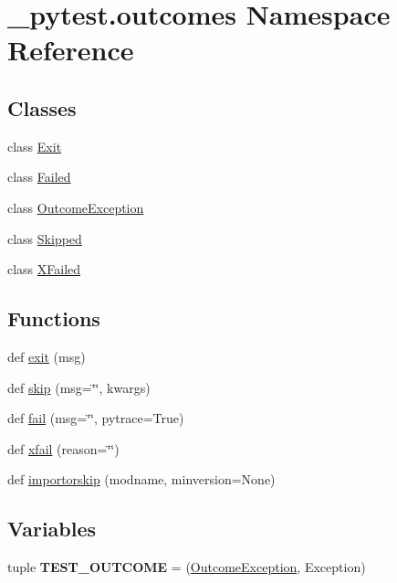 \hypertarget{namespace__pytest_1_1outcomes}{}\section{\+\_\+pytest.\+outcomes Namespace Reference}
\label{namespace__pytest_1_1outcomes}
\subsection*{Classes}
\begin{DoxyCompactItemize}
\item 
class \hyperlink{class__pytest_1_1outcomes_1_1_exit}{Exit}
\item 
class \hyperlink{class__pytest_1_1outcomes_1_1_failed}{Failed}
\item 
class \hyperlink{class__pytest_1_1outcomes_1_1_outcome_exception}{Outcome\+Exception}
\item 
class \hyperlink{class__pytest_1_1outcomes_1_1_skipped}{Skipped}
\item 
class \hyperlink{class__pytest_1_1outcomes_1_1_x_failed}{X\+Failed}
\end{DoxyCompactItemize}
\subsection*{Functions}
\begin{DoxyCompactItemize}
\item 
def \hyperlink{namespace__pytest_1_1outcomes_a80a3d7119b0e373d1a2b53ebf248a094}{exit} (msg)
\item 
def \hyperlink{namespace__pytest_1_1outcomes_a0866db5a141b016319ad83acc9febc06}{skip} (msg=\char`\"{}\char`\"{}, kwargs)
\item 
def \hyperlink{namespace__pytest_1_1outcomes_aea7cd78ad2dc857366fae4d25d05f02b}{fail} (msg=\char`\"{}\char`\"{}, pytrace=True)
\item 
def \hyperlink{namespace__pytest_1_1outcomes_a361095ab4d4b94436fbdf2663384f485}{xfail} (reason=\char`\"{}\char`\"{})
\item 
def \hyperlink{namespace__pytest_1_1outcomes_ad806324628e36473b1c76d4cb1948fc8}{importorskip} (modname, minversion=None)
\end{DoxyCompactItemize}
\subsection*{Variables}
\begin{DoxyCompactItemize}
\item 
\mbox{\label{namespace__pytest_1_1outcomes_a39222e93e981edb7fbba0267b8ef6032}} 
tuple {\bfseries T\+E\+S\+T\+\_\+\+O\+U\+T\+C\+O\+ME} = (\hyperlink{class__pytest_1_1outcomes_1_1_outcome_exception}{Outcome\+Exception}, Exception)
\end{DoxyCompactItemize}


